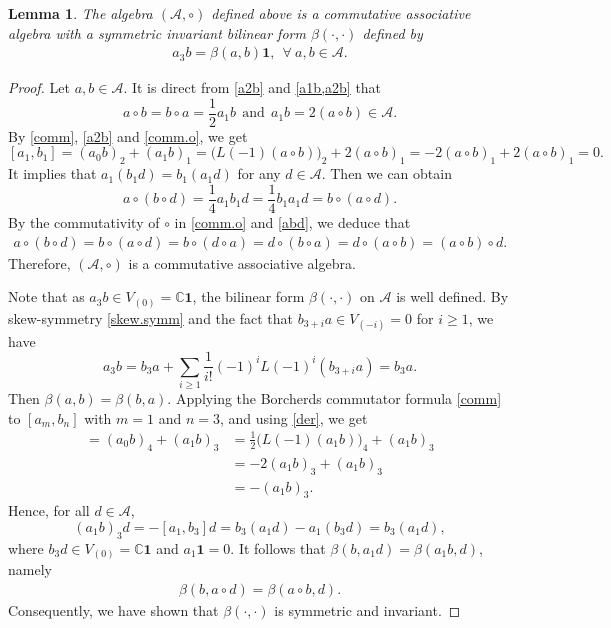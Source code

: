\documentclass[12pt]{article}
\numberwithin{equation}{section}
\newtheorem{lemma}[theorem]{Lemma}
\theoremstyle{definition}
\theoremstyle{plain}
\newcommand{\bC}{\ensuremath{\mathbb{C}}}
\newcommand{\cA}{\ensuremath{\mathcal{A}}}
\newcommand{\bone}{\mathbf{1 }}
\begin{document}
\begin{lemma}\label{lem:cA.o}
    The algebra $(\cA,\circ)$ defined above is a commutative associative algebra with a symmetric invariant bilinear form $\beta(\cdot,\cdot)$ defined by
    \begin{align*}
        a_3 b=\beta(a,b)\bone,\ \ \forall\ a,b\in \cA.
    \end{align*}
\end{lemma}
\begin{proof}
    Let $a,b\in \cA$. It is direct from \eqref{a2b} and \eqref{a1b,a2b} that
    \begin{equation}\label{comm.o}
        a\circ b=b\circ a=\frac{1}{2}a_1b\ \ \text{and}\ \ a_1b=2(a\circ b)\in \cA.
    \end{equation}
    By \eqref{comm}, \eqref{a2b} and \eqref{comm.o}, we get
    \begin{equation}\label{[a1,b1]}
        [a_1,b_1]=(a_0b)_2+(a_1b)_1=\big(L(-1)(a\circ b)\big)_2+2(a\circ b)_1=-2(a\circ b)_1+2(a\circ b)_1=0.
    \end{equation}
    It implies that $a_1(b_1d)=b_1(a_1d)$ for any $d\in \cA$. Then we can obtain
    \begin{equation}\label{abd}
        a\circ (b\circ d)=\frac{1}{4}a_1b_1d=\frac{1}{4}b_1a_1d=b\circ(a\circ d).
    \end{equation}
    By the commutativity of $\circ$ in \eqref{comm.o} and \eqref{abd}, we deduce that
    \begin{align*}
        a\circ (b\circ d)=b\circ(a\circ d)=b\circ(d\circ a)=d\circ(b\circ a)=d\circ (a\circ b)=(a\circ b)\circ d.
    \end{align*}
    Therefore, $(\cA,\circ)$ is a commutative associative algebra.

    Note that as $a_3b\in V_{(0)}=\bC\bone$, the bilinear form $\beta(\cdot,\cdot)$ on $\cA$ is well defined. By skew-symmetry \eqref{skew.symm} and the fact that $b_{3+i}a\in V_{(-i)}=0$ for $i\ge 1$, we have
    \begin{equation*}
        a_3b=b_3a+\sum_{i\ge1}\frac{1}{i!}(-1)^iL(-1)^i(b_{3+i}a)=b_3a.
    \end{equation*}
    Then $\beta(a,b)=\beta(b,a)$. Applying the Borcherds commutator formula \eqref{comm} to $[a_m,b_n]$ with $m=1$ and $n=3$, and using \eqref{der}, we get
    \begin{align*}
        [a_1,b_3]=(a_0b)_4+(a_1b)_3&=\frac{1}{2}\big(L(-1)(a_1b)\big)_4+(a_1b)_3\\
        &=-2(a_1b)_3+(a_1b)_3\\
        &=-(a_1b)_3.
    \end{align*}
    Hence, for all $d\in \cA$,
    \begin{equation*}
        (a_1b)_3d=-[a_1,b_3]d=b_3(a_1d)-a_1(b_3d)=b_3(a_1d),
    \end{equation*}
    where $b_3d\in V_{(0)}=\bC\bone$ and $a_1\bone=0$. It follows that $\beta( b,a_1d)=\beta(a_1b,d)$, namely
    \begin{align*}
        \beta( b, a\circ d)=\beta( a\circ b,d).
    \end{align*}
    Consequently, we have shown that $\beta(\cdot,\cdot)$ is symmetric and invariant.
\end{proof}
\end{document}
